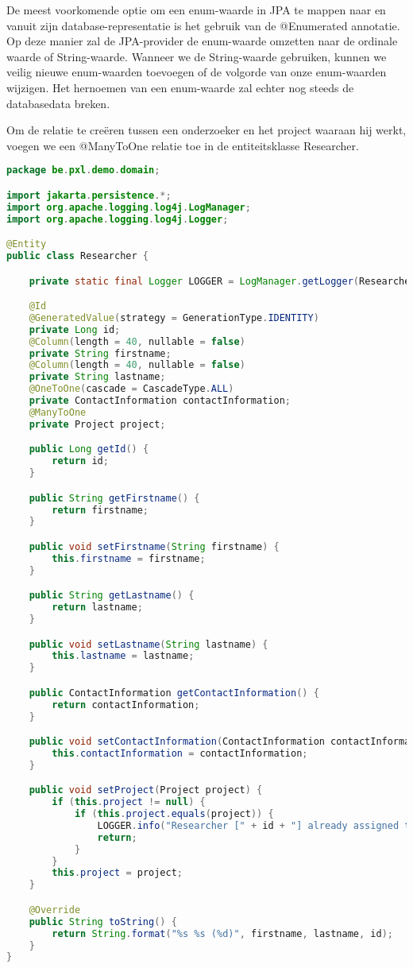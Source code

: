 De meest voorkomende optie om een enum-waarde in JPA te mappen naar en vanuit zijn database-representatie is het gebruik van de @Enumerated annotatie. Op deze manier zal de JPA-provider de enum-waarde  omzetten naar de ordinale waarde of String-waarde. Wanneer we de String-waarde gebruiken, kunnen we veilig nieuwe enum-waarden toevoegen of de volgorde van onze enum-waarden wijzigen. Het hernoemen van een enum-waarde zal echter nog steeds de databasedata breken.

Om de relatie te creëren tussen een onderzoeker en het project waaraan hij werkt, voegen we een @ManyToOne relatie toe in de entiteitsklasse Researcher.

\begin{lstlisting}[frame=single,language=java]
package be.pxl.demo.domain;

import jakarta.persistence.*;
import org.apache.logging.log4j.LogManager;
import org.apache.logging.log4j.Logger;

@Entity
public class Researcher {

	private static final Logger LOGGER = LogManager.getLogger(Researcher.class);

	@Id
	@GeneratedValue(strategy = GenerationType.IDENTITY)
	private Long id;
	@Column(length = 40, nullable = false)
	private String firstname;
	@Column(length = 40, nullable = false)
	private String lastname;
	@OneToOne(cascade = CascadeType.ALL)
	private ContactInformation contactInformation;
	@ManyToOne
	private Project project;

	public Long getId() {
		return id;
	}

	public String getFirstname() {
		return firstname;
	}

	public void setFirstname(String firstname) {
		this.firstname = firstname;
	}

	public String getLastname() {
		return lastname;
	}

	public void setLastname(String lastname) {
		this.lastname = lastname;
	}

	public ContactInformation getContactInformation() {
		return contactInformation;
	}

	public void setContactInformation(ContactInformation contactInformation) {
		this.contactInformation = contactInformation;
	}

	public void setProject(Project project) {
		if (this.project != null) {
			if (this.project.equals(project)) {
				LOGGER.info("Researcher [" + id + "] already assigned to [" + project.getName() + "]");
				return;
			}
		}
		this.project = project;
	}

	@Override
	public String toString() {
		return String.format("%s %s (%d)", firstname, lastname, id);
	}
}
\end{lstlisting}

